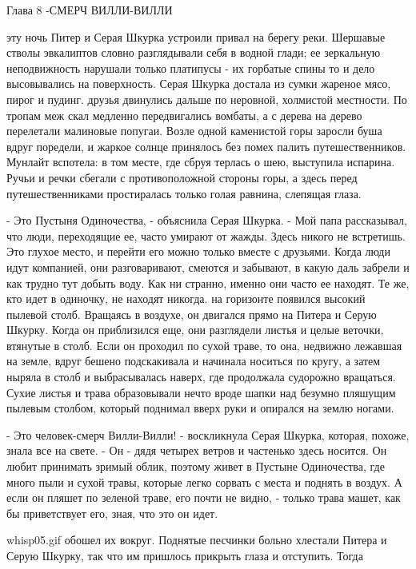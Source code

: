 Глава 8
-СМЕРЧ ВИЛЛИ-ВИЛЛИ
\par{} эту ночь Питер и Серая Шкурка устроили привал на берегу реки. 
Шершавые стволы эвкалиптов словно разглядывали себя в водной глади; ее 
зеркальную неподвижность нарушали только платипусы - их горбатые спины 
то и дело высовывались на поверхность. Серая Шкурка достала из сумки 
жареное мясо, пирог и пудинг.
 друзья двинулись дальше по неровной, холмистой местности. По 
тропам меж скал медленно передвигались вомбаты, а с дерева на дерево 
перелетали малиновые попугаи. Возле одной каменистой горы заросли буша 
вдруг поредели, и жаркое солнце принялось без помех палить 
путешественников. Мунлайт вспотела: в том месте, где сбруя терлась о 
шею, выступила испарина. Ручьи и речки сбегали с противоположной 
стороны горы, а здесь перед путешественниками простиралась только 
голая равнина, слепящая глаза.
\par- Это Пустыня Одиночества, - объяснила Серая Шкурка. - Мой папа 
рассказывал, что люди, переходящие ее, часто умирают от жажды. Здесь 
никого не встретишь. Это глухое место, и перейти его можно только 
вместе с друзьями. Когда люди идут компанией, они разговаривают, 
смеются и забывают, в какую даль забрели и как трудно тут добыть воду. 
Как ни странно, именно они часто ее находят. Те же, кто идет в 
одиночку, не находят никогда.
 на горизонте появился высокий пылевой столб. Вращаясь в 
воздухе, он двигался прямо на Питера и Серую Шкурку. Когда он 
приблизился еще, они разглядели листья и целые веточки, втянутые в 
столб. Если он проходил по сухой траве, то она, недвижно лежавшая на 
земле, вдруг бешено подскакивала и начинала носиться по кругу, а затем 
ныряла в столб и выбрасывалась наверх, где продолжала судорожно 
вращаться. Сухие листья и трава образовывали нечто вроде шапки над 
безумно пляшущим пылевым столбом, который поднимал вверх руки и 
опирался на землю ногами.
\par- Это человек-смерч Вилли-Вилли! - воскликнула Серая Шкурка, 
которая, похоже, знала все на свете. - Он - дядя четырех ветров и 
частенько здесь носится. Он любит принимать зримый облик, поэтому 
живет в Пустыне Одиночества, где много пыли и сухой травы, которые 
легко сорвать с места и поднять в воздух. А если он пляшет по зеленой 
траве, его почти не видно, - только трава машет, как бы приветствует 
его, зная, что это он идет.
\par{whisp05.gif}
 обошел их вокруг. Поднятые песчинки больно хлестали Питера и 
Серую Шкурку, так что им пришлось прикрыть глаза и отступить. Тогда 
